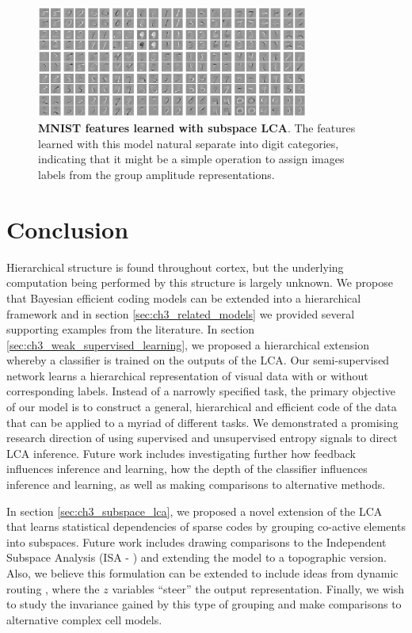 \begin{figure}[h]
    \centering
    \includegraphics[width=0.8\textwidth]{figures/subspace_lca_mnist_features.png}
    \caption{\textbf{MNIST features learned with subspace LCA}. The features learned with this model natural separate into digit categories, indicating that it might be a simple operation to assign images labels from the group amplitude representations.}
    \label{fig:ch3_subspace_lca_mnist_features}
\end{figure}

\section{Conclusion}\label{sec:ch3_conclusion}
Hierarchical structure is found throughout cortex, but the underlying computation being performed by this structure is largely unknown. We propose that Bayesian efficient coding models can be extended into a hierarchical framework and in section \ref{sec:ch3_related_models} we provided several supporting examples from the literature. In section \ref{sec:ch3_weak_supervised_learning}, we proposed a hierarchical extension whereby a classifier is trained on the outputs of the LCA. Our semi-supervised network learns a hierarchical representation of visual data with or without corresponding labels. Instead of a narrowly specified task, the primary objective of our model is to construct a general, hierarchical and efficient code of the data that can be applied to a myriad of different tasks. We demonstrated a promising research direction of using supervised and unsupervised entropy signals to direct LCA inference. Future work includes investigating further how feedback influences inference and learning, how the depth of the classifier influences inference and learning, as well as making comparisons to alternative methods.

In section \ref{sec:ch3_subspace_lca}, we proposed a novel extension of the LCA that learns statistical dependencies of sparse codes by grouping co-active elements into subspaces. Future work includes drawing comparisons to the Independent Subspace Analysis (ISA - \cite{hyvarinen2000emergence}) and extending the model to a topographic version. Also, we believe this formulation can be extended to include ideas from dynamic routing \parencite{olshausen1993neurobiological}, where the $z$ variables ``steer'' the output representation. Finally, we wish to study the invariance gained by this type of grouping and make comparisons to alternative complex cell models.